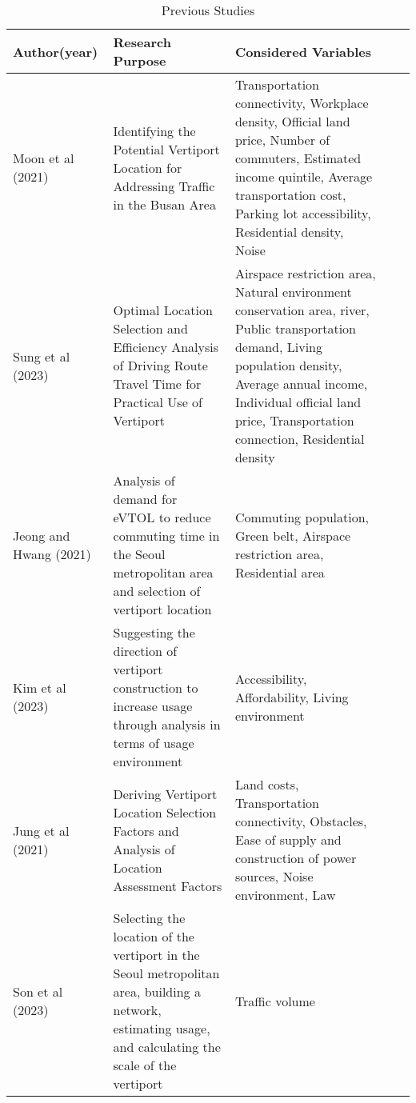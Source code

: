 \begin{longtable}[c]{@{}lllll@{}}
    \caption{Previous Studies}
    \label{tab:my-table}\\
    \toprule
    Author(year) & Research Purpose & Considered Variables \\* \midrule
    \endfirsthead
    \endhead
    \bottomrule
    \endfoot
    \endlastfoot
    Moon et al (2021) & \parbox[t]{5cm}{Identifying the Potential Vertiport Location for Addressing Traffic in the Busan Area\citep{MoonShiKang2021}} & \parbox[t]{5cm}{\raggedright Transportation connectivity, Workplace density, Official land price, Number of commuters, Estimated income quintile, Average transportation cost, Parking lot accessibility, Residential density, Noise\\} \\
    Sung et al (2023) & \parbox[t]{5cm}{Optimal Location Selection and Efficiency Analysis of Driving Route Travel Time for Practical Use of Vertiport\citep{SungKimChoiCho2023}} & \parbox[t]{5cm}{\raggedright Airspace restriction area, Natural environment conservation area, river, Public transportation demand, Living population density, Average annual income, Individual official land price, Transportation connection, Residential density\\} \\
    Jeong and Hwang (2021) & \parbox[t]{5cm}{Analysis of demand for eVTOL to reduce commuting time in the Seoul metropolitan area and selection of vertiport location\citep{JeongSoHwang2021}} & \parbox[t]{5cm}{\raggedright Commuting population, Green belt, Airspace restriction area, Residential area\\} \\
    Kim et al (2023) & \parbox[t]{5cm}{Suggesting the direction of vertiport construction to increase usage through analysis in terms of usage environment\citep{kim-2023}\\} & \parbox[t]{5cm}{\raggedright Accessibility, Affordability, Living environment\\}  \\
    Jung et al (2021) & \parbox[t]{5cm}{Deriving Vertiport Location Selection Factors and Analysis of Location Assessment Factors \citep{JungYuYun2021}\\} & \parbox[t]{5cm}{\raggedright Land costs, Transportation connectivity, Obstacles, Ease of supply and construction of power sources, Noise environment, Law\\} \\
    Son et al (2023) & \parbox[t]{5cm}{Selecting the location of the vertiport in the Seoul metropolitan area, building a network, estimating usage, and calculating the scale of the vertiport \citep{Son-2023}\\} & \parbox[t]{5cm}{\raggedright Traffic volume} \\
    

\end{longtable}
